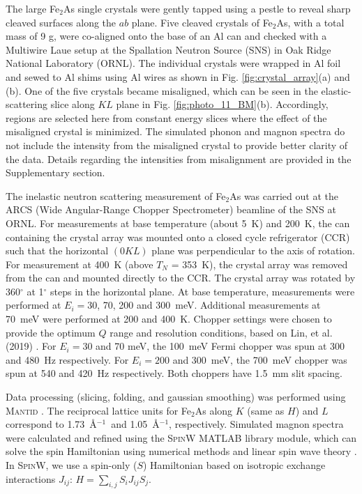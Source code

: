 \documentclass[letterpaper,10pt,doublespacing,edeposit]{uiucthesis2020}
\begin{document}
\begin{mainmatter}
The large Fe$_2$As single crystals were gently tapped using a pestle to reveal sharp cleaved surfaces along the $ab$ plane.
Five cleaved crystals of Fe$_2$As, with a total mass of 9 g, were co-aligned onto the base of an Al can and checked with a Multiwire Laue setup at the Spallation Neutron Source (SNS) \cite{mason2006spallation} in Oak Ridge National Laboratory (ORNL). The individual crystals were wrapped in Al foil and sewed to Al shims using Al wires as shown in Fig. \ref{fig:crystal_array}(a) and (b).
One of the five crystals became misaligned, which can be seen in the elastic-scattering slice along $KL$ plane in Fig. \ref{fig:photo_11_BM}(b).
Accordingly, regions are selected here from constant energy slices where the effect of the misaligned crystal is minimized. The simulated phonon and magnon spectra do not include the intensity from the misaligned crystal to provide better clarity of the data. Details regarding the intensities from misalignment are provided in the Supplementary section.

The inelastic neutron scattering measurement of Fe$_2$As
was carried out at the ARCS (Wide Angular-Range Chopper Spectrometer) beamline \cite{ doi:10.1063/1.3680104} of the SNS at ORNL. For measurements at  base temperature (about 5~K) and 200~K, the can containing the crystal array was mounted onto a closed cycle refrigerator (CCR) such that the horizontal $(0KL)$ plane was perpendicular to the axis of rotation. For measurement at 400~K (above $T_N$ = 353~K), the crystal array was removed from the can and mounted directly to the CCR. The crystal array was rotated by 360$^{\circ}$ at 1$^{\circ}$ steps in the horizontal plane.
At base temperature, measurements were performed at $E_i = 30$, 70, 200 and 300~meV.  Additional measurements at 70~meV were performed at 200 and 400~K.
Chopper settings were chosen to provide the optimum $Q$ range and resolution conditions, based on Lin, et al. (2019) \cite{Lin2019}. For $E_i = 30$ and  70 meV, the 100~meV Fermi chopper was spun at 300 and 480~Hz respectively.  For $E_i = 200$ and 300~meV, the 700~meV chopper was spun at 540 and 420~Hz respectively.  Both choppers have 1.5~mm slit spacing.


Data processing (slicing, folding, and gaussian smoothing) was performed using \textsc{Mantid} \cite{Arnold2014}. The reciprocal lattice units for Fe$_2$As along $K$ (same as $H$) and $L$ correspond to 1.73~\AA$^{-1}$~and 1.05~\AA$^{-1}$, respectively.
Simulated magnon spectra were calculated and refined using the \textsc{SpinW MATLAB} library module, which can solve the spin Hamiltonian using numerical methods and linear spin wave theory \cite{Toth_2015}. 
In \textsc{SpinW}, we use a spin-only ($S$)  Hamiltonian based on isotropic exchange interactions $J_{ij}$: $ H = \sum_{i,j} S_i J_{ij} S_j$.
    


\end{mainmatter}
\end{document}
